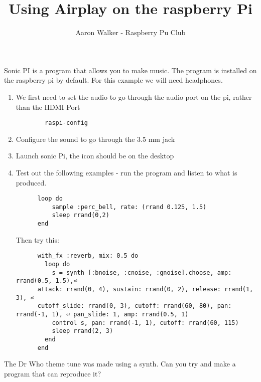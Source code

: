 \documentclass[11pt, oneside]{amsart}
\title{Using Airplay on the raspberry Pi}
\author{Aaron Walker - Raspberry Pu Club}
\begin{document}
\maketitle
  Sonic PI is a program that allows you to make music. The program is installed on the raspberry pi by default. For this example we will need headphones.
  \begin{enumerate}
    \item
      We first need to set the audio to go through the audio port on the pi, rather than the HDMI Port
      \begin{verbatim}
        raspi-config
      \end{verbatim}
    \item Configure the sound to go through the 3.5 mm jack
    \item Launch sonic Pi, the icon should be on the desktop
    \item Test out the following examples - run the program and listen to what is produced.
    \begin{verbatim}
      loop do
	      sample :perc_bell, rate: (rrand 0.125, 1.5)
	      sleep rrand(0,2)
      end
    \end{verbatim}
    Then try this:
    \begin{verbatim}
      with_fx :reverb, mix: 0.5 do
        loop do
          s = synth [:bnoise, :cnoise, :gnoise].choose, amp: rrand(0.5, 1.5),⏎
      attack: rrand(0, 4), sustain: rrand(0, 2), release: rrand(1, 3), ⏎
      cutoff_slide: rrand(0, 3), cutoff: rrand(60, 80), pan: rrand(-1, 1), ⏎ pan_slide: 1, amp: rrand(0.5, 1)
          control s, pan: rrand(-1, 1), cutoff: rrand(60, 115)
          sleep rrand(2, 3)
        end
      end
    \end{verbatim}
  \end{enumerate}
  The Dr Who theme tune was made using a synth. Can you try and make a program that can reproduce it?
\end{document}
